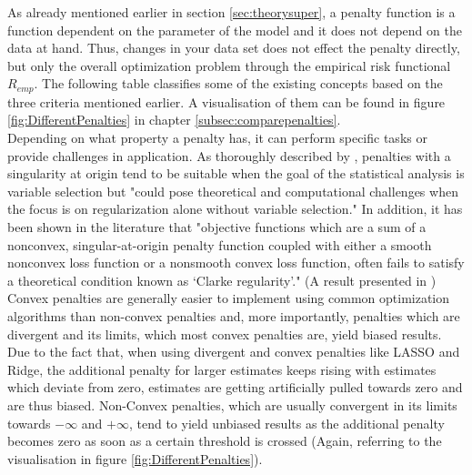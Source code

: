 \documentclass[12pt,a4paper]{article}
\begin{document}
\begin{center}
\end{center}

As already mentioned earlier in section \ref{sec:theorysuper}, a penalty function is a function dependent on the parameter of the model and it does not depend on the data at hand. Thus, changes in your data set does not effect the penalty directly, but only the overall optimization problem through the empirical risk functional $R_{emp}$. The following table classifies some of the existing concepts based on the three criteria mentioned earlier. A visualisation of them can be found in figure \ref{fig:DifferentPenalties} in chapter \ref{subsec:comparepenalties}.\\

Depending on what property a penalty has, it can perform specific tasks or provide challenges in application. As thoroughly described by \parencite{JohnVettamWu2022}, penalties with a singularity at origin tend to be suitable when the goal of the statistical analysis is variable selection but "could pose theoretical and computational challenges when the focus is on regularization alone without variable selection." In addition, it has been shown in the literature that "objective functions which are a sum of a nonconvex, singular-at-origin penalty function coupled with either a smooth nonconvex loss function or a nonsmooth convex loss function, often fails to satisfy a theoretical condition known as ‘Clarke regularity’." (A result presented in \textcite{QiCuiLiuPang2021}) 
Convex penalties are generally easier to implement using common optimization algorithms than non-convex penalties and, more importantly, penalties which are divergent and its limits, which most convex penalties are, yield biased results. Due to the fact that, when using divergent and convex penalties like LASSO and Ridge, the additional penalty for larger estimates keeps rising with estimates which deviate from zero, estimates are getting artificially pulled towards zero and are thus biased. Non-Convex penalties, which are usually convergent in its limits towards $-\infty$ and $+\infty$, tend to yield unbiased results as the additional penalty becomes zero as soon as a certain threshold is crossed (Again, referring to the visualisation in figure \ref{fig:DifferentPenalties}).
\end{document}
